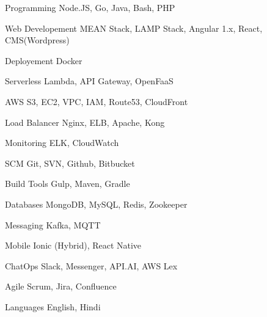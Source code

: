 

\begin{cvskills}


\cvskill
{Programming} %
{Node.JS, Go, Java, Bash, PHP} %


\cvskill
{Web Developement} %
{MEAN Stack, LAMP Stack, Angular 1.x, React, CMS(Wordpress)} %

\cvskill
{Deployement} %
{Docker} %

\cvskill
{Serverless} %
{Lambda, API Gateway, OpenFaaS} %


\cvskill
{AWS} %
{S3, EC2, VPC, IAM, Route53, CloudFront} %

\cvskill
{Load Balancer} %
{Nginx, ELB, Apache, Kong} %

\cvskill
{Monitoring} %
{ELK, CloudWatch} %

\cvskill
{SCM} %
{Git, SVN, Github, Bitbucket} %

\cvskill
{Build Tools} %
{Gulp, Maven, Gradle} %


\cvskill
{Databases} %
{MongoDB, MySQL, Redis, Zookeeper} %

\cvskill
{Messaging} %
{Kafka, MQTT} %

\cvskill
{Mobile} %
{Ionic (Hybrid), React Native} %

\cvskill
{ChatOps} %
{Slack, Messenger, API.AI, AWS Lex} %

\cvskill
{Agile} %
{Scrum, Jira, Confluence} %


\cvskill
{Languages} %
{English, Hindi} %


\end{cvskills}

